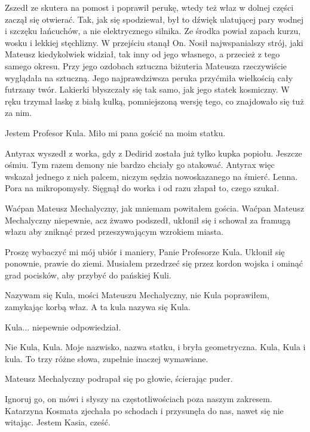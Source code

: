 Zszedł ze skutera na pomost i poprawił perukę, wtedy też właz w dolnej części zaczął się otwierać.
Tak, jak się spodziewał, był to dźwięk ulatującej pary wodnej i szczęku łańcuchów, a nie elektrycznego silnika.
Ze środka powiał zapach kurzu, wosku i lekkiej stęchlizny.
W przejściu stanął On.
Nosił najwspanialszy strój, jaki Mateusz kiedykolwiek widział, tak inny od jego własnego, a przecież z tego samego okresu.
Przy jego ozdobach sztuczna biżuteria Mateusza rzeczywiście wyglądała na sztuczną.
Jego najprawdziwsza peruka przyćmiła wielkością cały futrzany twór.
Lakierki błyszczały się tak samo, jak jego statek kosmiczny.
W ręku trzymał laskę z białą kulką, pomniejszoną wersję tego, co znajdowało się tuż za nim.

\ds{} Jestem Profesor Kula. Miło mi pana gościć na moim statku. \de{}

\divider{}

Antyrax wyszedł z worka, gdy z Dedirid została już tylko kupka popiołu.
Jeszcze ośmiu.
Tym razem demony nie bardzo chciały go atakować.
Antyrax więc wskazał jednego z nich palcem, niczym sędzia nowoskazanego na śmierć.
Lenna. Pora na mikropomysły.
Sięgnął do worka i od razu złapał to, czego szukał.

\divider{}

\ds{} Waćpan Mateusz Mechalyczny, jak mniemam \dm{} powitałem gościa. \dm{} Waćpan Mateusz Mechalyczny niepewnie, acz żwawo podszedł, ukłonił się i schował za framugą włazu
aby zniknąć przed przeszywającym wzrokiem miasta. \de{}

\ds{} Proszę wybaczyć mi mój ubiór i maniery, Panie Profesorze Kula. \dm{} Ukłonił się ponownie, prawie do ziemi. \dm{}
Musiałem przedrzeć się przez kordon wojska i ominąć grad pocisków, aby przybyć do pańskiej Kuli. \de{}

\ds{} Nazywam się Kula, mości Mateuszu Mechalyczny, nie Kula \dm{} poprawiłem, zamykając korbą właz. \dm{} A ta kula nazywa się Kula. \de{}

\ds{} Kula... \dm{} niepewnie odpowiedział. \de{}

\ds{} Nie Kula, Kula. Moje nazwisko, nazwa statku, i bryła geometryczna. Kula, Kula i kula. To trzy różne słowa, zupełnie inaczej wymawiane. \de{}

Mateusz Mechalyczny podrapał się po głowie, ścierając puder.

\ds{} Ignoruj go, on mówi i słyszy na częstotliwościach poza naszym zakresem. \dm{} Katarzyna Kosmata zjechała po schodach i przysunęła do nas, nawet się nie witając.
\dm{} Jestem Kasia, cześć. \de{}

